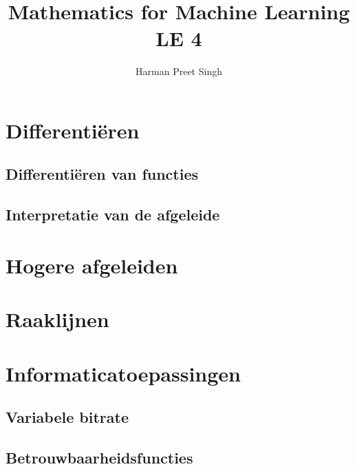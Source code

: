 \documentclass[a4paper, 12pt]{article}
\title{Mathematics for Machine Learning \textemdash{} LE 4}
\author{Harman Preet Singh}
\begin{document}

\maketitle
\tableofcontents

\section{Differentiëren}
\subsection{Differentiëren van functies}
\subsection{Interpretatie van de afgeleide}

\section{Hogere afgeleiden}
\section{Raaklijnen}

\section{Informaticatoepassingen}
\subsection{Variabele bitrate}
\subsection{Betrouwbaarheidsfuncties}
\end{document}
